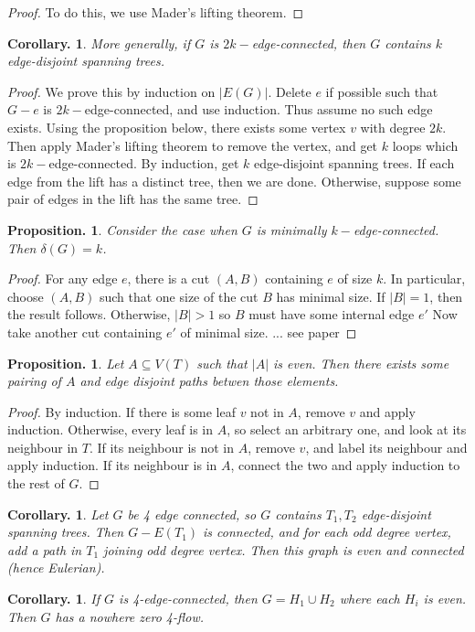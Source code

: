 \documentclass[11pt, a4paper]{memoir}
\theoremstyle{change}
\newtheorem{corollary}[theorem]{Corollary.}
\newtheorem{proposition}[theorem]{Proposition.}
\theoremstyle{plain}
\theoremstyle{nonumberplain}
\newtheorem{proof}{Proof}
\numberwithin{equation}{section}
\begin{document}
\begin{proof}
    To do this, we use Mader's lifting theorem.
\end{proof}
\begin{corollary}
    More generally, if $G$ is $2k-$edge-connected, then $G$ contains $k$ edge-disjoint spanning trees.
\end{corollary}
\begin{proof}
    We prove this by induction on $|E(G)|$.
    Delete $e$ if possible such that $G-e$ is $2k-$edge-connected, and use induction.
    Thus assume no such edge exists.
    Using the proposition below, there exists some vertex $v$ with degree $2k$.
    Then apply Mader's lifting theorem to remove the vertex, and get $k$ loops which is $2k-$edge-connected.
    By induction, get $k$ edge-disjoint spanning trees.
    If each edge from the lift has a distinct tree, then we are done.
    Otherwise, suppose some pair of edges in the lift has the same tree.
\end{proof}
\begin{proposition}
    Consider the case when $G$ is minimally $k-$edge-connected.
    Then $\delta(G)=k$.
\end{proposition}
\begin{proof}
    For any edge $e$, there is a cut $(A,B)$ containing $e$ of size $k$.
    In particular, choose $(A,B)$ such that one size of the cut $B$ has minimal size.
    If $|B|=1$, then the result follows.
    Otherwise, $|B|>1$ so $B$ must have some internal edge $e'$
    Now take another cut containing $e'$ of minimal size.
    ... see paper
\end{proof}
\begin{proposition}
    Let $A\subseteq V(T)$ such that $|A|$ is even.
    Then there exists some pairing of $A$ and edge disjoint paths betwen those elements.
\end{proposition}
\begin{proof}
    By induction.
    If there is some leaf $v$ not in $A$, remove $v$ and apply induction.
    Otherwise, every leaf is in $A$, so select an arbitrary one, and look at its neighbour in $T$.
    If its neighbour is not in $A$, remove $v$, and label its neighbour and apply induction.
    If its neighbour is in $A$, connect the two and apply induction to the rest of $G$.
\end{proof}
\begin{corollary}
    Let $G$ be 4 edge connected, so $G$ contains $T_1,T_2$ edge-disjoint spanning trees.
    Then $G-E(T_1)$ is connected, and for each odd degree vertex, add a path in $T_1$ joining odd degree vertex.
    Then this graph is even and connected (hence Eulerian).
\end{corollary}
\begin{corollary}
    If $G$ is 4-edge-connected, then $G=H_1\cup H_2$ where each $H_i$ is even.
    Then $G$ has a nowhere zero 4-flow.
\end{corollary}
\end{document}
